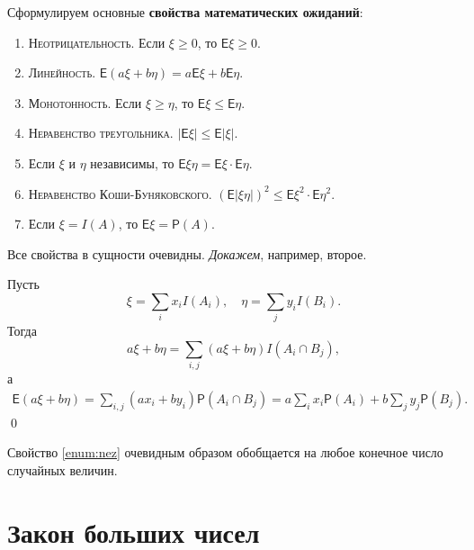 Сформулируем основные \textbf{свойства математических ожиданий}:
\begin{enumerate} %
	\item \textsc{Неотрицательность}. Если $ \xi \geqslant 0  $, то $ \mathsf E \xi
		\geqslant 0 $.
\item\textsc{Линейность.} $ \mathsf E(a\xi + b\eta) = a\mathsf E\xi + b \mathsf E\eta
		$.
	\item\textsc{Монотонность.} Если $ \xi \geqslant \eta $, то $ \mathsf E\xi \leqslant
		\mathsf E \eta$.
	\item \textsc{Неравенство треугольника.} $ |\mathsf E\xi| \leqslant \mathsf E
		|\xi|$.
	\item\label{enum:nez} Если $ \xi $ и $ \eta $ независимы, то $ \mathsf E \xi \eta = \mathsf E
		\xi \cdot \mathsf E\eta$.
\item\textsc{Неравенство Коши-Буняковского.} $ (\mathsf E
		|\xi\eta|)^2\leqslant\mathsf E \xi^2 \cdot \mathsf E\eta^2 $.
	\item Если $ \xi = I(A) $, то $ \mathsf E \xi = \mathsf P(A) $.
\end{enumerate}
Все свойства в сущности очевидны. \emph{Докажем}, например, второе.

Пусть  
\[
	\xi = \sum_{i} x_i I(A_i), \quad \eta = \sum_{j} y_i I(B_i).
\]
Тогда 
\[
	a\xi + b\eta = \sum_{i,j} (a\xi + b\eta) I(A_i\cap B_j),
\]
а 
\begin{multline*}
	\mathsf E(a\xi + b\eta) = \sum_{i,j} (ax_i + by_i) \mathsf P(A_i\cap B_j)=
	a\sum_i x_i \mathsf P(A_i) + b\sum_j y_j \mathsf P(B_j).
\end{multline*}
\qed

\begin{remark*} Свойство \ref{enum:nez} очевидным образом обобщается на любое
	конечное число случайных величин.
\end{remark*}





\section{Закон больших чисел}
